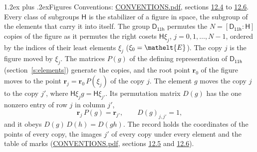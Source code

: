 \documentclass[10pt,a4paper]{article}
\makeatletter
\renewcommand\section{\@startsection{section}{1}{\z@}{-3ex plus -1ex minus -.2ex}%
  {1.2ex plus .2ex}{\normalfont\large\sffamily\bfseries\color{parttitle}}}
\numberwithin{equation}{section}
\newcommand{\eltfont}[1]{{\let\sigma\eltsigma\mathelt{#1}}}
\newcommand{\grp}[1]{\mathsf{#1}}
\newcommand{\cls}[1]{\eltfont{#1}}
\newcommand{\pointr}{\mathbf{r}}
\makeatother
\begin{document}
\section{Figures}\label{s:permutation}
Conventions: \href{../../CONVENTIONS.pdf}{CONVENTIONS.pdf}, sections \href{../../CONVENTIONS.pdf\#conv.12.4}{12.4} to \href{../../CONVENTIONS.pdf\#conv.12.6}{12.6}.
Every class of subgroups $\grp{H}$ is the stabilizer of a figure in space, the subgroup of the elements that carry it into itself. \label{n:local.orbit.size}\label{n:element.coset.least}\label{n:index.coset}The group $\grp{D_{11h}}$ permutes the $N = [\grp{D_{11h}} : \grp{H}]$ copies of the figure as it permutes the right cosets $\grp{H}\xi_j$, $j = 0, 1, \dots, N - 1$, ordered by the indices of their least elements $\xi_j$ ($\xi_0 = \cls{E}$). The copy $j$ is the figure moved by $\xi_j$. The matrices $P(g)$ of the defining representation of $\grp{D_{11h}}$ (section~\ref{s:elements}) generate the copies, and the root point $\pointr_0$ of the figure moves to the point $\pointr_j = \pointr_0\, P(\xi_j)$ of the copy $j$. \label{n:local.coset.image}The element $g$ moves the copy $j$ to the copy $j'$, where $\grp{H}\xi_j g = \grp{H}\xi_{j'}$. \label{n:local.matrix.permutation}Its permutation matrix $D(g)$ has the one nonzero entry of row $j$ in column $j'$,
\begin{equation}\label{e:perm.matrix}\pointr_j\, P(g) = \pointr_{j'}, \qquad D(g)_{j,j'} = 1,\end{equation}
and it obeys $D(g)\, D(h) = D(gh)$. The record holds the coordinates of the points of every copy, the images $j'$ of every copy under every element and the table of marks (\href{../../CONVENTIONS.pdf}{CONVENTIONS.pdf}, sections \href{../../CONVENTIONS.pdf\#conv.12.5}{12.5} and \href{../../CONVENTIONS.pdf\#conv.12.6}{12.6}).
\end{document}
